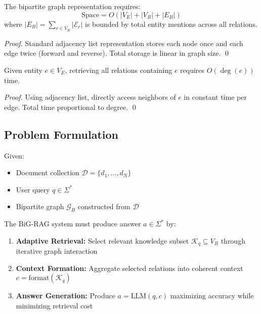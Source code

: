 \documentclass[11pt,a4paper]{article}
\begin{document}
\begin{proposition}
The bipartite graph representation requires:
\begin{equation}
\text{Space} = O(|V_E| + |V_R| + |E_B|)
\end{equation}
where $|E_B| = \sum_{r \in V_R} |\mathcal{E}_r|$ is bounded by total entity mentions across all relations.
\end{proposition}

\begin{proof}
Standard adjacency list representation stores each node once and each edge twice (forward and reverse). Total storage is linear in graph size. \qed
\end{proof}

\begin{proposition}
Given entity $e \in V_E$, retrieving all relations containing $e$ requires $O(\deg(e))$ time.
\end{proposition}

\begin{proof}
Using adjacency list, directly access neighbors of $e$ in constant time per edge. Total time proportional to degree. \qed
\end{proof}

\subsection{Problem Formulation}

\begin{definition}
Given:
\begin{itemize}
    \item Document collection $\mathcal{D} = \{d_1, \ldots, d_N\}$
    \item User query $q \in \Sigma^*$
    \item Bipartite graph $\mathcal{G}_B$ constructed from $\mathcal{D}$
\end{itemize}

The BiG-RAG system must produce answer $a \in \Sigma^*$ by:
\begin{enumerate}
    \item \textbf{Adaptive Retrieval:} Select relevant knowledge subset $\mathcal{K}_q \subseteq V_R$ through iterative graph interaction
    \item \textbf{Context Formation:} Aggregate selected relations into coherent context $c = \text{format}(\mathcal{K}_q)$
    \item \textbf{Answer Generation:} Produce $a = \text{LLM}(q, c)$ maximizing accuracy while minimizing retrieval cost
\end{enumerate}
\end{definition}
\end{document}
